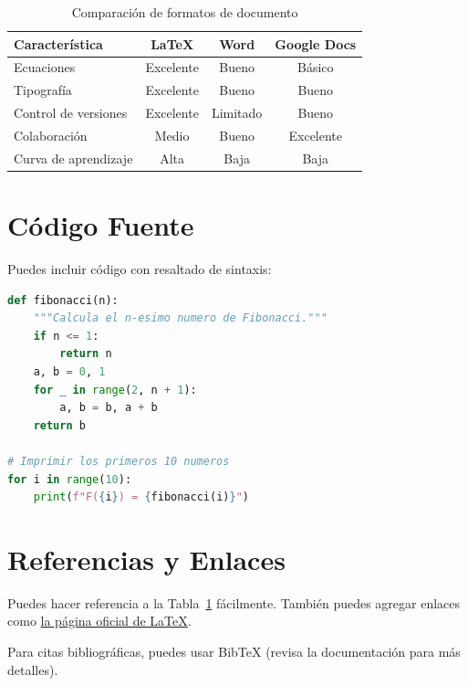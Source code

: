 \documentclass[12pt, a4paper]{article}
\begin{document}
\begin{table}[h]
    \centering
    \caption{Comparación de formatos de documento}
    \label{tab:formatos}
    \begin{tabular}{@{}lccc@{}}
        \toprule
        \textbf{Característica} & \textbf{\LaTeX} & \textbf{Word} & \textbf{Google Docs} \\
        \midrule
        Ecuaciones          & Excelente  & Bueno    & Básico  \\
        Tipografía          & Excelente  & Bueno    & Bueno   \\
        Control de versiones & Excelente & Limitado & Bueno   \\
        Colaboración        & Medio      & Bueno    & Excelente \\
        Curva de aprendizaje & Alta      & Baja     & Baja    \\
        \bottomrule
    \end{tabular}
\end{table}

\section{Código Fuente}

Puedes incluir código con resaltado de sintaxis:

\begin{lstlisting}[language=Python, caption={Ejemplo en Python}]
def fibonacci(n):
    """Calcula el n-esimo numero de Fibonacci."""
    if n <= 1:
        return n
    a, b = 0, 1
    for _ in range(2, n + 1):
        a, b = b, a + b
    return b

# Imprimir los primeros 10 numeros
for i in range(10):
    print(f"F({i}) = {fibonacci(i)}")
\end{lstlisting}

\section{Referencias y Enlaces}

Puedes hacer referencia a la Tabla~\ref{tab:formatos} fácilmente. También puedes agregar enlaces como \href{https://www.latex-project.org/}{la página oficial de \LaTeX}.

Para citas bibliográficas, puedes usar BibTeX (revisa la documentación para más detalles).

\end{document}
